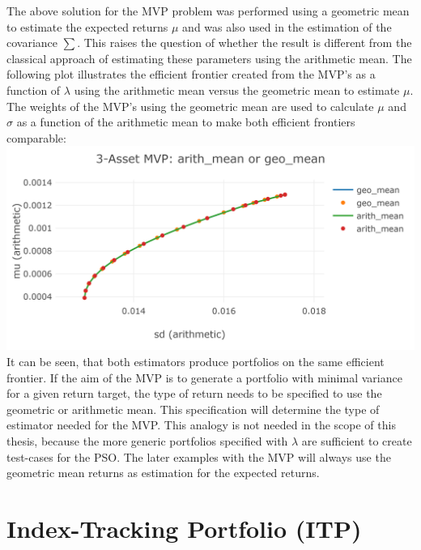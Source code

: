 \documentclass[
  oneside]{book}
\begin{document}
The above solution for the MVP problem was performed using a geometric mean to estimate the expected returns \(\mu\) and was also used in the estimation of the covariance \(\textstyle\sum\). This raises the question of whether the result is different from the classical approach of estimating these parameters using the arithmetic mean. The following plot illustrates the efficient frontier created from the MVP's as a function of \(\lambda\) using the arithmetic mean versus the geometric mean to estimate \(\mu\). The weights of the MVP's using the geometric mean are used to calculate \(\mu\) and \(\sigma\) as a function of the arithmetic mean to make both efficient frontiers comparable:
\includegraphics{Master_Thesis_files/figure-latex/unnamed-chunk-4-1.png}
It can be seen, that both estimators produce portfolios on the same efficient frontier. If the aim of the MVP is to generate a portfolio with minimal variance for a given return target, the type of return needs to be specified to use the geometric or arithmetic mean. This specification will determine the type of estimator needed for the MVP. This analogy is not needed in the scope of this thesis, because the more generic portfolios specified with \(\lambda\) are sufficient to create test-cases for the PSO. The later examples with the MVP will always use the geometric mean returns as estimation for the expected returns.

\hypertarget{index-tracking-portfolio-itp}{%
\section{Index-Tracking Portfolio (ITP)}\label{index-tracking-portfolio-itp}}
\end{document}
